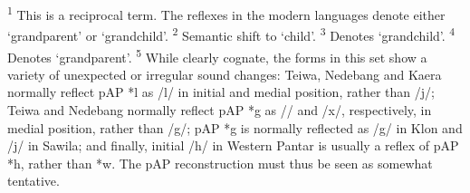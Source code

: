 \textsuperscript{1} This is a reciprocal term. The reflexes in the modern languages denote either `grandparent' or `grandchild'.  \textsuperscript{2} Semantic shift to `child'.  \textsuperscript{3} Denotes `grandchild'.  \textsuperscript{4} Denotes `grandparent'.  \textsuperscript{5} While clearly cognate, the forms in this set show a variety of unexpected or irregular sound changes: Teiwa, Nedebang and Kaera normally reflect pAP *l as /l/ in initial and medial position, rather than /j/; Teiwa and Nedebang normally reflect pAP *g as /{\pharfric}/ and /x/, respectively, in medial position, rather than /g/; pAP *g is normally reflected as /g/ in Klon and /j/ in Sawila; and finally, initial /h/ in Western Pantar is usually a reflex of pAP *h, rather than *w. The pAP reconstruction must thus be seen as somewhat tentative.






